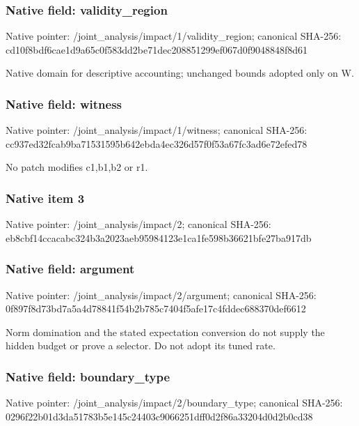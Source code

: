 \documentclass[10pt,a4paper]{article}
\begin{document}
\subsubsection{Native field: validity\_\allowbreak{}region}
Native pointer: /joint\_\allowbreak{}analysis/impact/1/validity\_\allowbreak{}region; canonical SHA-256: cd10f8bdf6cae1d9a65c0f583dd2be71dec208851299ef067d0f9048848f8d61

\begingroup\raggedright\sloppy Native domain for descriptive accounting;\allowbreak{} unchanged bounds adopted only on W.\par\endgroup

\subsubsection{Native field: witness}
Native pointer: /joint\_\allowbreak{}analysis/impact/1/witness; canonical SHA-256: cc937ed32fcab9ba71531595b642ebda4ec326d57f0f53a67fc3ad6e72efed78

\begingroup\raggedright\sloppy No patch modifies c1,\allowbreak{}b1,\allowbreak{}b2 or r1.\par\endgroup

\subsubsection{Native item 3}
Native pointer: /joint\_\allowbreak{}analysis/impact/2; canonical SHA-256: eb8cbf14ccacabc324b3a2023aeb95984123e1ca1fe598b36621bfe27ba917db

\subsubsection{Native field: argument}
Native pointer: /joint\_\allowbreak{}analysis/impact/2/argument; canonical SHA-256: 0f897f8d73bd7a5a4d78841f54b2b785c7404f5afe17c4fddec688370def6612

\begingroup\raggedright\sloppy Norm domination and the stated expectation conversion do not supply the hidden budget or prove a selector. Do not adopt its tuned rate.\par\endgroup

\subsubsection{Native field: boundary\_\allowbreak{}type}
Native pointer: /joint\_\allowbreak{}analysis/impact/2/boundary\_\allowbreak{}type; canonical SHA-256: 0296f22b01d3da51783b5e145c24403c9066251dff0d2f86a33204d0d2b0cd38
\end{document}
